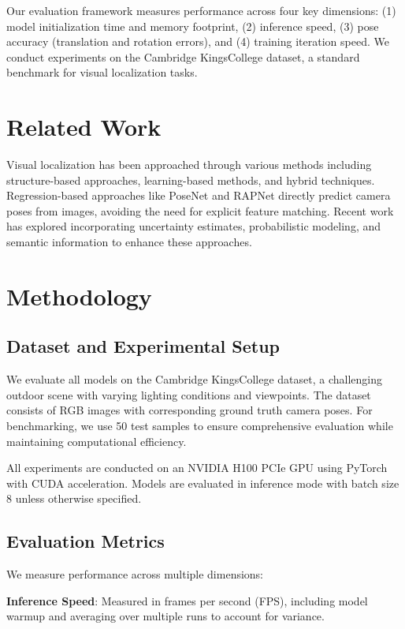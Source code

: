 \documentclass[11pt,a4paper]{article}
\begin{document}
Our evaluation framework measures performance across four key dimensions: (1) model initialization time and memory footprint, (2) inference speed, (3) pose accuracy (translation and rotation errors), and (4) training iteration speed. We conduct experiments on the Cambridge KingsCollege dataset, a standard benchmark for visual localization tasks.

\section{Related Work}

Visual localization has been approached through various methods including structure-based approaches, learning-based methods, and hybrid techniques. Regression-based approaches like PoseNet and RAPNet directly predict camera poses from images, avoiding the need for explicit feature matching. Recent work has explored incorporating uncertainty estimates, probabilistic modeling, and semantic information to enhance these approaches.

\section{Methodology}

\subsection{Dataset and Experimental Setup}

We evaluate all models on the Cambridge KingsCollege dataset, a challenging outdoor scene with varying lighting conditions and viewpoints. The dataset consists of RGB images with corresponding ground truth camera poses. For benchmarking, we use 50 test samples to ensure comprehensive evaluation while maintaining computational efficiency.

All experiments are conducted on an NVIDIA H100 PCIe GPU using PyTorch with CUDA acceleration. Models are evaluated in inference mode with batch size 8 unless otherwise specified.

\subsection{Evaluation Metrics}

We measure performance across multiple dimensions:

\textbf{Inference Speed}: Measured in frames per second (FPS), including model warmup and averaging over multiple runs to account for variance.
\end{document}
